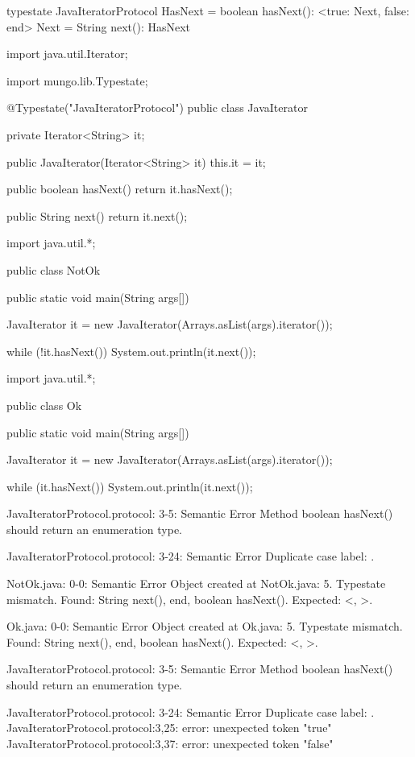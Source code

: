 \begin{code}
typestate JavaIteratorProtocol {
  HasNext = {
    boolean hasNext(): <true: Next, false: end>
  }
  Next = {
    String next(): HasNext
  }
}\end{code}

\begin{code}
import java.util.Iterator;

import mungo.lib.Typestate;

@Typestate("JavaIteratorProtocol")
public class JavaIterator {

  private Iterator<String> it;

  public JavaIterator(Iterator<String> it) {
    this.it = it;
  }

  public boolean hasNext() {
    return it.hasNext();
  }

  public String next() {
    return it.next();
  }

}\end{code}

\begin{code}
import java.util.*;

public class NotOk {
  public static void main(String args[]) {
    JavaIterator it = new JavaIterator(Arrays.asList(args).iterator());

    while (!it.hasNext()) {
      System.out.println(it.next());
    }
  }
}\end{code}

\begin{code}
import java.util.*;

public class Ok {
  public static void main(String args[]) {
    JavaIterator it = new JavaIterator(Arrays.asList(args).iterator());

    while (it.hasNext()) {
      System.out.println(it.next());
    }
  }
}\end{code}

\lstset{caption=Original Mungo output}
\begin{code}

JavaIteratorProtocol.protocol: 3-5: Semantic Error
		Method boolean hasNext() should return an enumeration type.

JavaIteratorProtocol.protocol: 3-24: Semantic Error
		Duplicate case label: .

NotOk.java: 0-0: Semantic Error
		Object created at NotOk.java: 5. Typestate mismatch. Found: String next(), end, boolean hasNext(). Expected: <, >.

Ok.java: 0-0: Semantic Error
		Object created at Ok.java: 5. Typestate mismatch. Found: String next(), end, boolean hasNext(). Expected: <, >.

JavaIteratorProtocol.protocol: 3-5: Semantic Error
		Method boolean hasNext() should return an enumeration type.

JavaIteratorProtocol.protocol: 3-24: Semantic Error
		Duplicate case label: .
JavaIteratorProtocol.protocol:3,25: error: unexpected token "true"
JavaIteratorProtocol.protocol:3,37: error: unexpected token "false"
\end{code}


